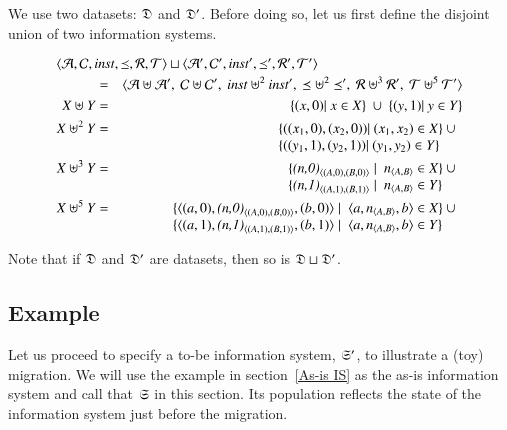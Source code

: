 \documentclass{elsarticle}
\begin{document}
   We use two datasets: $\mathfrak{D}$ and $\mathfrak{D}'$.
   Before doing so, let us first define the disjoint union of two information systems.
\begin{definition}
\begin{eqnarray}
   \omit\rlap{$\la\atoms,\concepts,\inst,\isa,\rels,\triples\ra\sqcup\la\atoms',\concepts',\inst',\isa',\rels',\triples'\ra$}\notag\\
   &=&\la\atoms\uplus\atoms',\ \concepts\uplus\concepts',\ \inst\uplus^2\inst',\ \isa\uplus^2\isa',\ \rels\uplus^3\rels',\ \triples\uplus^5\triples'\ra\notag\\
      X\uplus Y&=&\{(x,0)|\ x\in X\}\ \cup\ \{(y,1)|\ y\in Y\}\\
      X\uplus^2 Y&=&\begin{array}[t]{@{}l}\{((x_1,0),(x_2,0))|\ (x_1,x_2)\in X\}\ \cup\\ \{((y_1,1),(y_2,1))|\ (y_1,y_2)\in Y\}\end{array}\\
      X\uplus^3 Y&=&\begin{array}[t]{@{}l}\{\declare{(n,0)}{(A,0)}{(B,0)}\mid\ \declare{n}{A}{B}\in X\}\ \cup\\ \{\declare{(n,1)}{(A,1)}{(B,1)}\mid\ \declare{n}{A}{B}\in Y\}\end{array}\\
      X\uplus^5 Y&=&\begin{array}[t]{@{}l}\{\triple{(a,0)}{\declare{(n,0)}{(A,0)}{(B,0)}}{(b,0)}\mid\ \triple{a}{\declare{n}{A}{B}}{b}\in X\}\ \cup\\ \{\triple{(a,1)}{\declare{(n,1)}{(A,1)}{(B,1)}}{(b,1)}\mid\ \triple{a}{\declare{n}{A}{B}}{b}\in Y\}\end{array}
\end{eqnarray}
\end{definition}
Note that if $\mathfrak{D}$ and $\mathfrak{D}'$ are datasets, then so is $\mathfrak{D}\sqcup\mathfrak{D}'$.

\subsection{Example}
   Let us proceed to specify a to-be information system, $\mathfrak{S}'$, to illustrate a (toy) migration.
   We will use the example in section~\ref{As-is IS} as the as-is information system
   and call that $\mathfrak{S}$ in this section.
   Its population reflects the state of the information system just before the migration.
\end{document}
